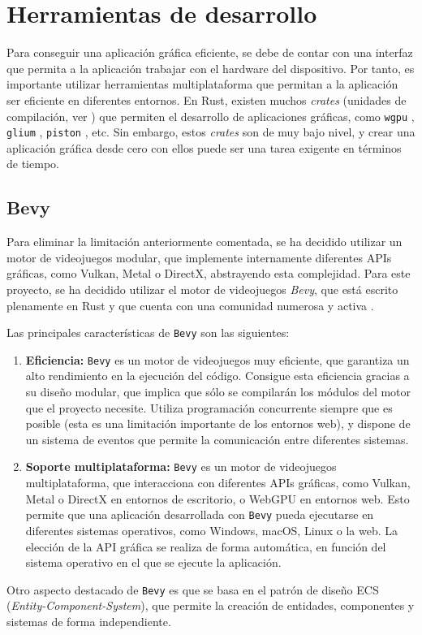 \section{Herramientas de desarrollo}
\noindent Para conseguir una aplicación gráfica eficiente, se debe de contar con una interfaz que permita a la aplicación trabajar con el hardware del dispositivo. Por tanto, es importante utilizar herramientas multiplataforma que permitan a la aplicación ser eficiente en diferentes entornos. En Rust, existen muchos \textit{crates} (unidades de compilación, ver \autocite{PackagesCratesRust}) que permiten el desarrollo de aplicaciones gráficas, como \texttt{wgpu} \autocite{WgpuPortableGraphics}, \texttt{glium} \autocite{GliumGlium2025}, \texttt{piston} \autocite{PistonModularOpen}, etc. Sin embargo, estos \textit{crates} son de muy bajo nivel, y crear una aplicación gráfica desde cero con ellos puede ser una tarea exigente en términos de tiempo. 

\subsection{Bevy} \label{subsec:bevy}
\noindent Para eliminar la limitación anteriormente comentada, se ha decidido utilizar un motor de videojuegos modular, que implemente internamente diferentes APIs gráficas, como Vulkan, Metal o DirectX, abstrayendo esta complejidad. Para este proyecto, se ha decidido utilizar el motor de videojuegos \textit{Bevy}, que está escrito plenamente en Rust y que cuenta con una comunidad numerosa y activa \autocite{BevyEngine}.

Las principales características de \texttt{Bevy} son las siguientes:
\begin{enumerate}
    \item \textbf{Eficiencia:} \texttt{Bevy} es un motor de videojuegos muy eficiente, que garantiza un alto rendimiento en la ejecución del código. Consigue esta eficiencia gracias a su diseño modular, que implica que sólo se compilarán los módulos del motor que el proyecto necesite. Utiliza programación concurrente siempre que es posible (esta es una limitación importante de los entornos web), y dispone de un sistema de eventos que permite la comunicación entre diferentes sistemas.
    \item \textbf{Soporte multiplataforma:} \texttt{Bevy} es un motor de videojuegos multiplataforma, que interacciona con diferentes APIs gráficas, como Vulkan, Metal o DirectX en entornos de escritorio, o WebGPU en entornos web. Esto permite que una aplicación desarrollada con \texttt{Bevy} pueda ejecutarse en diferentes sistemas operativos, como Windows, macOS, Linux o la web. La elección de la API gráfica se realiza de forma automática, en función del sistema operativo en el que se ejecute la aplicación.
\end{enumerate}

Otro aspecto destacado de \texttt{Bevy} es que se basa en el patrón de diseño ECS (\textit{Entity-Component-System}), que permite la creación de entidades, componentes y sistemas de forma independiente. 